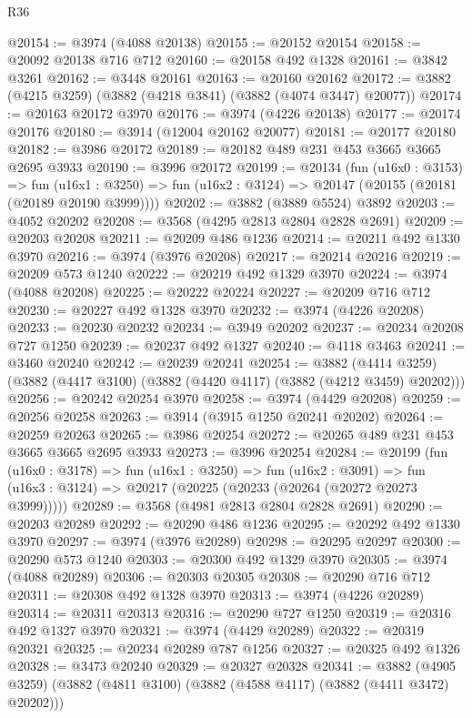 \begin{lexlean}{R36}
\begin{coremodule}
@20154 := @3974 (@4088 @20138)
@20155 := @20152 @20154
@20158 := @20092 @20138 @716 @712
@20160 := @20158 @492 @1328
@20161 := @3842 @3261
@20162 := @3448 @20161
@20163 := @20160 @20162
@20172 := @3882 (@4215 @3259) (@3882 (@4218 @3841) (@3882 (@4074 @3447) @20077))
@20174 := @20163 @20172 @3970
@20176 := @3974 (@4226 @20138)
@20177 := @20174 @20176
@20180 := @3914 (@12004 @20162 @20077)
@20181 := @20177 @20180
@20182 := @3986 @20172
@20189 := @20182 @489 @231 @453 @3665 @3665 @2695 @3933
@20190 := @3996 @20172
@20199 := @20134
    (fun (u16x0 : @3153) =>
    fun (u16x1 : @3250) => fun (u16x2 : @3124) => @20147 (@20155 (@20181 (@20189 @20190 @3999))))
@20202 := @3882 (@3889 @5524) @3892
@20203 := @4052 @20202
@20208 := @3568 (@4295 @2813 @2804 @2828 @2691)
@20209 := @20203 @20208
@20211 := @20209 @486 @1236
@20214 := @20211 @492 @1330 @3970
@20216 := @3974 (@3976 @20208)
@20217 := @20214 @20216
@20219 := @20209 @573 @1240
@20222 := @20219 @492 @1329 @3970
@20224 := @3974 (@4088 @20208)
@20225 := @20222 @20224
@20227 := @20209 @716 @712
@20230 := @20227 @492 @1328 @3970
@20232 := @3974 (@4226 @20208)
@20233 := @20230 @20232
@20234 := @3949 @20202
@20237 := @20234 @20208 @727 @1250
@20239 := @20237 @492 @1327
@20240 := @4118 @3463
@20241 := @3460 @20240
@20242 := @20239 @20241
@20254 := @3882
    (@4414 @3259)
    (@3882 (@4417 @3100) (@3882 (@4420 @4117) (@3882 (@4212 @3459) @20202)))
@20256 := @20242 @20254 @3970
@20258 := @3974 (@4429 @20208)
@20259 := @20256 @20258
@20263 := @3914 (@3915 @1250 @20241 @20202)
@20264 := @20259 @20263
@20265 := @3986 @20254
@20272 := @20265 @489 @231 @453 @3665 @3665 @2695 @3933
@20273 := @3996 @20254
@20284 := @20199
    (fun (u16x0 : @3178) =>
    fun (u16x1 : @3250) =>
    fun (u16x2 : @3091) =>
    fun (u16x3 : @3124) => @20217 (@20225 (@20233 (@20264 (@20272 @20273 @3999)))))
@20289 := @3568 (@4981 @2813 @2804 @2828 @2691)
@20290 := @20203 @20289
@20292 := @20290 @486 @1236
@20295 := @20292 @492 @1330 @3970
@20297 := @3974 (@3976 @20289)
@20298 := @20295 @20297
@20300 := @20290 @573 @1240
@20303 := @20300 @492 @1329 @3970
@20305 := @3974 (@4088 @20289)
@20306 := @20303 @20305
@20308 := @20290 @716 @712
@20311 := @20308 @492 @1328 @3970
@20313 := @3974 (@4226 @20289)
@20314 := @20311 @20313
@20316 := @20290 @727 @1250
@20319 := @20316 @492 @1327 @3970
@20321 := @3974 (@4429 @20289)
@20322 := @20319 @20321
@20325 := @20234 @20289 @787 @1256
@20327 := @20325 @492 @1326
@20328 := @3473 @20240
@20329 := @20327 @20328
@20341 := @3882
    (@4905 @3259)
    (@3882 (@4811 @3100) (@3882 (@4588 @4117) (@3882 (@4411 @3472) @20202)))

\end{coremodule}
\end{lexlean}
